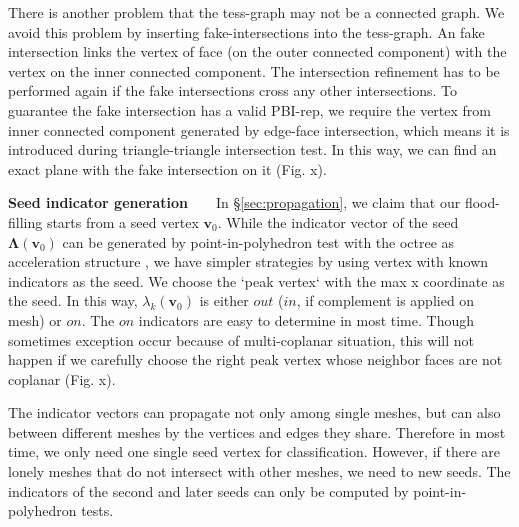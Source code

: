 \documentclass[10pt,journal,compsoc]{IEEEtran}
\begin{document}
\vspace{0.5em}\noindent There is another problem that the tess-graph may not be a connected graph. We avoid this problem by inserting fake-intersections into the tess-graph. An fake intersection links the vertex of face (on the outer connected component) with the vertex on the inner connected component. The intersection refinement has to be performed again if the fake intersections cross any other intersections. To guarantee the fake intersection has a valid PBI-rep, we require the vertex from inner connected component generated by edge-face intersection, which means it is introduced during triangle-triangle intersection test. In this way, we can find an exact plane with the fake intersection on it (Fig. x).

\vspace{0.5em}
\noindent\textbf{Seed indicator generation}~~~~In \S\ref{sec:propagation}, we claim that our flood-filling starts from a seed vertex $\bm{v}_0$. While the indicator vector of the seed $\bm{\Lambda}(\bm{v}_0)$ can be generated by point-in-polyhedron test \cite{ogayar2005point} with the octree as acceleration structure \cite{frisken2002simple}, we have simpler strategies by using vertex with known indicators as the seed. We choose the `peak vertex` with the max x coordinate as the seed. In this way, $\lambda_k(\bm{v}_0)$ is either $out$ ($in$, if complement is applied on mesh) or $on$. The $on$ indicators are easy to determine in most time. Though sometimes exception occur because of multi-coplanar situation, this will not happen if we carefully choose the right peak vertex whose neighbor faces are not coplanar (Fig. x).

\vspace{0.5em}\noindent The indicator vectors can propagate not only among single meshes, but can also between different meshes by the vertices and edges they share. Therefore in most time, we only need one single seed vertex for classification. However, if there are lonely meshes that do not intersect with other meshes, we need to new seeds. The indicators of the second and later seeds can only be computed by point-in-polyhedron tests.

\end{document}
